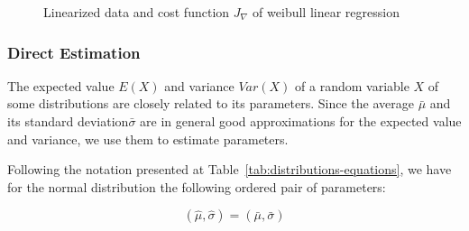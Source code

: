 \begin{figure}[ht!]
\centering
{}
\label{fig:linearization-cost}
\caption{Linearized data and cost function $J_\nabla$ of weibull linear regression}
\end{figure}


\subsubsection{Direct Estimation}

The expected value  $E(X)$ and variance $Var(X)$ of a random variable $X$ of some distributions are closely related to its parameters. Since the average $\bar{\mu}$ and its standard deviation$\bar{\sigma}$ are in general good approximations for the expected value and variance, we use them to estimate parameters.

Following the notation presented at Table~\ref{tab:distributions-equations}, we have for the normal distribution the following ordered pair of parameters:

\begin{equation}
(\hat{\mu}, \hat{\sigma}) = (\bar{\mu}, \bar{\sigma})
\end{equation}

